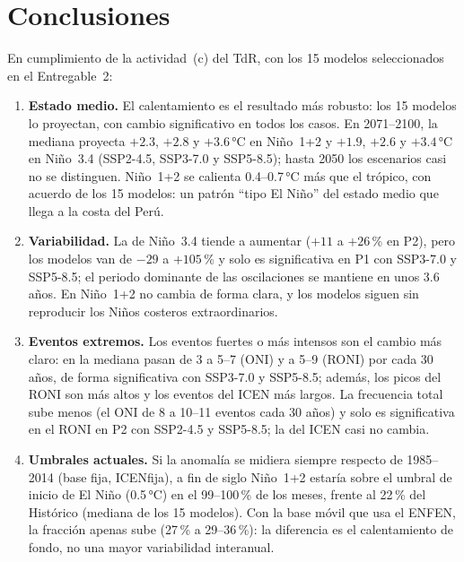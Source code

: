 \documentclass[11pt,a4paper]{article}
\begin{document}
\section{Conclusiones}
\label{sec:conclusiones}

En cumplimiento de la actividad~(c) del TdR, con los 15 modelos seleccionados en el Entregable~2:

\begin{enumerate}[label=(\roman*)]
\item \textbf{Estado medio.} El calentamiento es el resultado más robusto: los 15 modelos lo proyectan, con cambio significativo en todos los casos.
En 2071--2100, la mediana proyecta $+2.3$, $+2.8$ y $+3.6$\,°C en Niño~1+2 y $+1.9$, $+2.6$ y $+3.4$\,°C en Niño~3.4 (SSP2-4.5, SSP3-7.0 y SSP5-8.5); hasta 2050 los escenarios casi no se distinguen.
Niño~1+2 se calienta 0.4--0.7\,°C más que el trópico, con acuerdo de los 15 modelos: un patrón ``tipo El Niño'' del estado medio que llega a la costa del Perú.
\item \textbf{Variabilidad.} La de Niño~3.4 tiende a aumentar ($+11$ a $+26$\,\% en P2), pero los modelos van de $-29$ a $+105$\,\% y solo es significativa en P1 con SSP3-7.0 y SSP5-8.5; el periodo dominante de las oscilaciones se mantiene en unos 3.6 años.
En Niño~1+2 no cambia de forma clara, y los modelos siguen sin reproducir los Niños costeros extraordinarios.
\item \textbf{Eventos extremos.} Los eventos fuertes o más intensos son el cambio más claro: en la mediana pasan de 3 a 5--7 (ONI) y a 5--9 (RONI) por cada 30 años, de forma significativa con SSP3-7.0 y SSP5-8.5; además, los picos del RONI son más altos y los eventos del ICEN más largos.
La frecuencia total sube menos (el ONI de 8 a 10--11 eventos cada 30 años) y solo es significativa en el RONI en P2 con SSP2-4.5 y SSP5-8.5; la del ICEN casi no cambia.
\item \textbf{Umbrales actuales.} Si la anomalía se midiera siempre respecto de 1985--2014 (base fija, ICENfija), a fin de siglo Niño~1+2 estaría sobre el umbral de inicio de El Niño (0.5\,°C) en el 99--100\,\% de los meses, frente al 22\,\% del Histórico (mediana de los 15 modelos). Con la base móvil que usa el ENFEN, la fracción apenas sube (27\,\% a 29--36\,\%): la diferencia es el calentamiento de fondo, no una mayor variabilidad interanual.
\end{enumerate}
\end{document}

